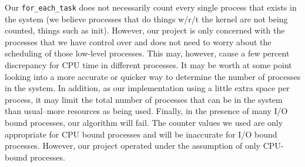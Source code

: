 \documentclass[10pt]{article}
\begin{document}
Our \texttt{for\_each\_task} does not necessarily count every single process that exists in the system (we believe processes that do things w/r/t the kernel are not being counted, things such as init). However, our project is only concerned with the processes that we have control over and does not need to worry about the scheduling of those low-level processes. This may, however, cause a few percent discrepancy for CPU time in different processes. It may be worth at some point looking into a more accurate or quicker way to determine the number of processes in the system. In addition, as our implementation using a little extra space per process, it may limit the total number of processes that can be in the system than usual--more resources as being used. Finally, in the presence of many I/O bound processes, our algorithm will fail. The counter values we used are only appropriate for CPU bound processes and will be inaccurate for I/O bound processes. However, our project operated under the assumption of only CPU-bound processes.
\end{document}
